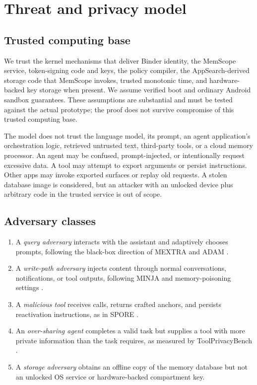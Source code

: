 \section{Threat and privacy model}
\label{sec:threat}

\subsection{Trusted computing base}

We trust the kernel mechanisms that deliver Binder identity, the MemScope service, token-signing code and keys, the policy compiler, the AppSearch-derived storage code that MemScope invokes, trusted monotonic time, and hardware-backed key storage when present. We assume verified boot and ordinary Android sandbox guarantees. These assumptions are substantial and must be tested against the actual prototype; the proof does not survive compromise of this trusted computing base.

The model does not trust the language model, its prompt, an agent application's orchestration logic, retrieved untrusted text, third-party tools, or a cloud memory processor. An agent may be confused, prompt-injected, or intentionally request excessive data. A tool may attempt to export arguments or persist instructions. Other apps may invoke exported surfaces or replay old requests. A stolen database image is considered, but an attacker with an unlocked device plus arbitrary code in the trusted service is out of scope.

\subsection{Adversary classes}

\begin{enumerate}[leftmargin=*]
  \item A \emph{query adversary} interacts with the assistant and adaptively chooses prompts, following the black-box direction of MEXTRA and ADAM \citep{wang2025mextra,lyu2026adam}.
  \item A \emph{write-path adversary} injects content through normal conversations, notifications, or tool outputs, following MINJA and memory-poisoning settings \citep{dong2025minja,wang2026hijacking,gao2026mempoison}.
  \item A \emph{malicious tool} receives calls, returns crafted anchors, and persists reactivation instructions, as in SPORE \citep{gao2026spore}.
  \item An \emph{over-sharing agent} completes a valid task but supplies a tool with more private information than the task requires, as measured by ToolPrivacyBench \citep{hu2026toolprivacy}.
  \item A \emph{storage adversary} obtains an offline copy of the memory database but not an unlocked OS service or hardware-backed compartment key.
\end{enumerate}

